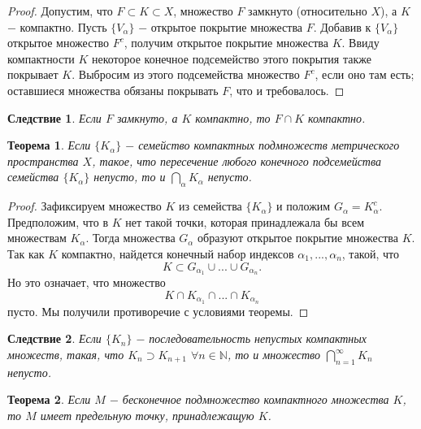\documentclass{article}
\newtheorem{theorem}{Теорема}[section]
\newtheorem*{consequence}{Следствие}
\begin{document}
\begin{proof}
Допустим, что \(F \subset K \subset X\), множество \(F\) замкнуто (относительно \(X\)), а \(K\) \(-\) компактно. Пусть \(\{V_\alpha\}\) \(-\) открытое покрытие множества \(F\). Добавив к \(\{V_\alpha\}\) открытое множество \(F^c\), получим открытое покрытие множества \(K\). Ввиду компактности \(K\) некоторое конечное подсемейство этого покрытия также покрывает \(K\). Выбросим из этого подсемейства множество \(F^c\), если оно там есть; оставшиеся множества обязаны покрывать \(F\), что и требовалось.
\end{proof}

\begin{consequence}
Если \(F\) замкнуто, а \(K\) компактно, то \(F \cap K\) компактно.
\end{consequence}

\begin{theorem}
Если \(\{K_\alpha\}\) \(-\) семейство компактных подмножеств метрического пространства \(X\), такое, что пересечение любого конечного подсемейства семейства \(\{K_\alpha\}\) непусто, то и \(\bigcap\limits_{\alpha}K_\alpha\) непусто.
\end{theorem}

\begin{proof}
Зафиксируем множество \(K\) из семейства \(\{K_\alpha\}\) и положим \(G_\alpha = K^c_{\alpha}\). Предположим, что в \(K\) нет такой точки, которая принадлежала бы всем множествам \(K_\alpha\). Тогда множества \(G_\alpha\) образуют открытое покрытие множества \(K\). Так как \(K\) компактно, найдется конечный набор индексов \(\alpha_1, ..., \alpha_n\), такой, что
\[
K \subset G_{\alpha_1} \cup ... \cup G_{\alpha_n}.
\]
Но это означает, что множество
\[
K \cap K_{\alpha_1} \cap ... \cap K_{\alpha_n}
\]
пусто. Мы получили противоречие с условиями теоремы.
\end{proof}

\begin{consequence}
Если \(\{K_n\}\) \(-\) последовательность непустых компактных множеств, такая, что \(K_n \supset K_{n + 1}\) \(\forall n \in \mathbb{N}\), то и множество \(\bigcap\limits_{n=1}^{\infty}K_n\) непусто.
\end{consequence}

\begin{theorem}
Если \(M\) \(-\) бесконечное подмножество компактного множества \(K\), то \(M\) имеет предельную точку, принадлежащую \(K\).
\end{theorem}
\end{document}

